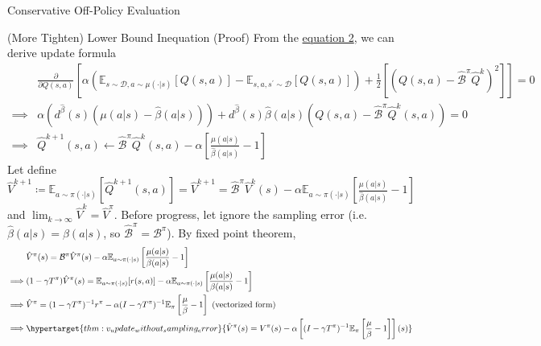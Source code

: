 \documentclass[11pt]{beamer}
\newcommand{\mbb}[1]{\mathbb{#1}}
\newcommand{\mc}[1]{\mathcal{#1}}
\begin{document}
\begin{frame}{Conservative Off-Policy Evaluation}
  \begin{block}{(More Tighten) Lower Bound Inequation (Proof)}
    From the \hyperlink{eq:2}{equation 2}, we can derive update formula
    \[
      \begin{aligned}
        &\frac{\partial}{\partial Q(s,a)} \left[ \alpha (\mbb{E}_{s \sim \mc{D}, a \sim \mu(\cdot|s)}[Q(s,a)] - \mbb{E}_{s,a,s^\prime \sim \mc{D}}[Q(s,a)]) + \frac{1}{2}\left[\left(Q(s,a) - \hat{\mc{B}}^\pi \hat{Q}^k\right)^2 \right]\right] =0 \\
        \implies &\alpha (d^{\hat{\beta}}(s)(\mu(a|s) - \hat{\beta}(a|s))) + d^{\hat{\beta}}(s) \hat{\beta}(a|s)(Q(s,a) - \hat{\mc{B}}^\pi \hat{Q}^k(s,a)) = 0 \\
        \implies &\hat{Q}^{k+1}(s,a) \leftarrow \hat{\mc{B}}^\pi \hat{Q}^k (s,a) - \alpha \left[\frac{\mu(a|s)}{\hat{\beta}(a|s)} -1\right]
      \end{aligned}
    \]
    Let define $\hat{V}^{k+1} \coloneqq \mbb{E}_{a \sim \pi(\cdot|s)} [\hat{Q}^{k+1}(s,a)]=\hat{V}^{k+1} = \hat{\mc{B}}^\pi \hat{V}^k (s) - \alpha \mbb{E}_{a \sim \pi(\cdot|s)}\left[\frac{\mu(a|s)}{\hat{\beta}(a|s)} - 1\right]$ and $\lim_{k \to \infty} \hat{V}^{k} = \hat{V}^\pi$.
    Before progress, let ignore the sampling error (i.e. $\hat{\beta}(a|s) = \beta(a|s)$, so $\hat{\mc{B}}^\pi = \mc{B}^\pi$).
    By fixed point theorem,
    \[
    \begin{aligned}
      &\hat{V}^\pi(s) = \mc{B}^\pi \hat{V}^\pi (s) - \alpha \mbb{E}_{a \sim \pi(\cdot|s)} \left[\frac{\mu(a|s)}{\beta(a|s)} -1\right] \\
      \implies &(1 - \gamma T^{\pi})\hat{V}^\pi (s) = \mbb{E}_{a \sim \pi(\cdot|s)} [r(s,a)] - \alpha \mbb{E}_{a \sim \pi(\cdot |s)} \left[\frac{\mu(a|s)}{\beta(a|s)} -1\right]\\
      \implies &\hat{V}^\pi = (1 - \gamma T^\pi)^{-1} r^{\pi} - \alpha (I - \gamma T^{\pi})^{-1}\mbb{E}_{\pi}\left[\frac{\mu}{\beta}-1\right] \text{ (vectorized form)} \\
      \implies & \hypertarget{thm:v_update_without_sampling_error}{\hat{V}^{\pi}(s) = V^{\pi}(s) - \alpha \left[(I - \gamma T^{\pi})^{-1}\mbb{E}_{\pi} \left[\frac{\mu}{\beta} -1\right] \right](s)}
    \end{aligned}
    \]
  \end{block}
\end{frame}
\end{document}
